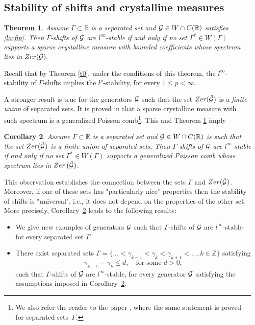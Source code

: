 \documentclass[12pt]{amsart}
\numberwithin{equation}{section}
\newtheorem{theorem}{Theorem}[section]
\newtheorem{corollary}[theorem]{Corollary} \newcommand{\La}{\Lambda}
\newcommand{\R}{{\mathbb R}} \newcommand{\Q}{{\mathbb Q}} \newcommand{\Z}{{\mathbb Z}} \newcommand{\N}{{\mathbb N}}
\newcommand{\Zer}{{\rm Zer}}
\begin{document}
\subsection{Stability of shifts and crystalline measures}

\begin{theorem}\label{t5}
    Assume $\Gamma\subset\R$ is a separated set and  $\Ff\in W\cap C(\R)$  satisfies  \eqref{locfin}.
    Then $\Gamma$-shifts of $\mathcal{G}$ are $l^{\infty}$-stable if and only if no set $\Gamma^\ast\in W(\Gamma)$ supports a sparse crystalline measure with bounded coefficients whose spectrum lies in ${\rm Zer}(\hat\Ff).$
\end{theorem}

Recall that by Theorem \ref{t0}, under the conditions of this theorem, the $l^\infty$-stability of $\Gamma$-shifts implies the $l^p$-stability, for every $1\leq p<\infty.$

A stronger result is true for the generators $\mathcal{G}$ such that the set  ${\rm Zer}(\hat\Ff)$   
is a {\it finite union} of separated sets. 
It is proved in \cite[Theorem~2.2]{MR3667579} that a sparse crystalline measure with such spectrum is a generalized Poisson comb\footnote{ We also refer the reader to the paper \cite{MR3338010}, where the same statement is proved for separated sets~$\Gamma$.}. This and  Theorem \ref{t5} imply
\begin{corollary}\label{t6}
    Assume $\Gamma\subset\R$ is a separated set and  $\Ff\in W\cap C(\R)$   is such that the set $\Zer(\hat\Ff)$ is a finite union of separated sets.
    Then $\Gamma$-shifts of $\mathcal{G}$ are $l^{\infty}$-stable if and only if  no set $\Gamma^\ast\in W(\Gamma)$  supports a generalized Poisson comb whose spectrum lies in $\Zer\,(\hat\Ff)$.
\end{corollary}


 This observation establishes the connection between the sets $\Gamma$ and $\Zer(\hat{\Ff})$. Moreover, if one of these sets has "particularly nice" properties then the stability of shifts is "universal", i.e., it does not depend on the properties of the other set. More precisely, Corollary~\ref{t6} leads to the following results:
\begin{itemize} 
    \item  We give new examples of generators $\mathcal{G}$ such that $\Gamma$-shifts of $\mathcal{G}$ are $l^{\infty}$-stable for every separated set $\Gamma$. 
    \item  There exist separated sets $\Gamma=\{...<\gamma_{k-1}<\gamma_k<\gamma_{k+1}<..., k\in\Z\}$ satisfying 
    \begin{equation}\label{reldense}
        \gamma_{k+1}-\gamma_k\leq d,\quad  \mbox{for some } d>0,
    \end{equation}
    such that $\Gamma$-shifts of $\mathcal{G}$ are $l^{\infty}$-stable, for every generator $\mathcal{G}$ satisfying the assumptions imposed in Corollary~\ref{t6}.
\end{itemize}
\end{document}
